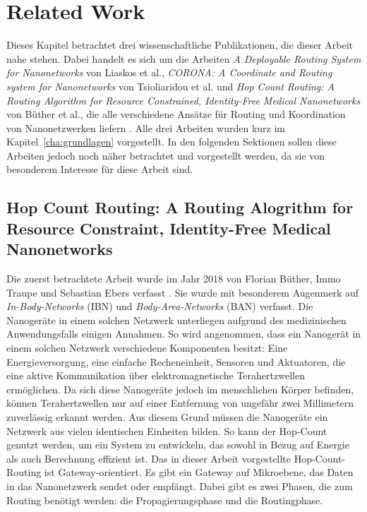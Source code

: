 \chapter{Related Work}
\label{cha:relatedwork}
Dieses Kapitel betrachtet drei wissenschaftliche Publikationen, die dieser Arbeit nahe stehen. Dabei handelt es sich um die Arbeiten \emph{A Deployable Routing System for Nanonetworks} von Liaskos et al., \emph{CORONA: A Coordinate and Routing system for Nanonetworks} von Tsioliaridou et al. und \emph{Hop Count Routing: A Routing Algorithm for Resource Constrained, Identity-Free Medical Nanonetworks} von Büther et al., die alle verschiedene Ansätze für Routing und Koordination von Nanonetzwerken liefern \cite{buether2018hop, tsioliaridou2015corona, liaskos2016routing}. Alle drei Arbeiten wurden kurz im Kapitel~\ref{cha:grundlagen} vorgestellt. In den folgenden Sektionen sollen diese Arbeiten jedoch noch näher betrachtet und vorgestellt werden, da sie von besonderem Interesse für diese Arbeit sind.

\section{Hop Count Routing: A Routing Alogrithm for Resource Constraint, Identity-Free Medical Nanonetworks}


Die zuerst betrachtete Arbeit wurde im Jahr 2018 von Florian Büther, Immo Traupe und Sebastian Ebers verfasst \cite{buether2018hop}. Sie wurde mit besonderem Augenmerk auf \emph{In-Body-Networks} (IBN) und \emph{Body-Area-Networks} (BAN) verfasst. Die Nanogeräte in einem solchen Netzwerk unterliegen aufgrund des medizinischen Anwendungsfalls einigen Annahmen. So wird angenommen, dass ein Nanogerät in einem solchen Netzwerk verschiedene Komponenten besitzt: Eine Energieversorgung, eine einfache Recheneinheit, Sensoren und Aktuatoren, die eine aktive Kommunikation über elektromagnetische Terahertzwellen ermöglichen.  Da sich diese Nanogeräte jedoch im menschlichen Körper befinden, können Terahertzwellen nur auf einer Entfernung von ungefähr zwei Millimetern zuverlässig erkannt werden. Aus diesem Grund müssen die Nanogeräte ein Netzwerk aus vielen identischen Einheiten bilden. So kann der Hop-Count genutzt werden, um ein System zu entwickeln, das sowohl in Bezug auf Energie als auch Berechnung effizient ist.
Das in dieser Arbeit vorgestellte Hop-Count-Routing ist Gateway-orientiert. Es gibt ein Gateway auf Mikroebene, das Daten in das Nanonetzwerk sendet oder empfängt. Dabei gibt es zwei Phasen, die zum Routing benötigt werden: die Propagierungsphase und die Routingphase. 

